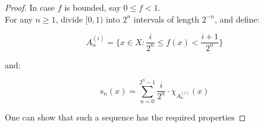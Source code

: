 \begin{proof}
    In case $f$ is bounded, say $0 \leq f < 1$.\\ 
    
    For any $n \geq 1$, divide $[0, 1)$ into $2^{n}$ intervals of length 
    $2^{-n}$, and define:

    $$A_{n}^{(i)} = \{x \in X: \frac{i}{2^n} \leq f(x) < \frac{i + 1}{2^n}\}$$

    and:

    $$s_n(x) = \sum_{n = 0}^{2^n - 1} \frac{i}{2^n} \cdot \chi_{A_{n}^{(i)}}(x)$$

    One can show that such a sequence has the required properties
\end{proof}